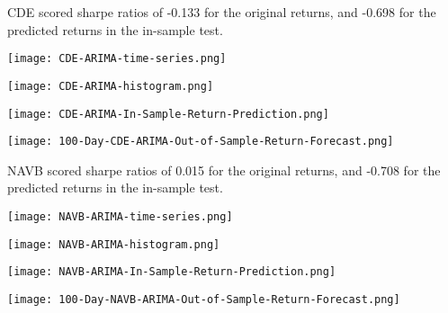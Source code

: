 CDE scored sharpe ratios of -0.133 for the original returns, and -0.698 for the predicted returns in the in-sample test.

\begin{center}
    \texttt{[image: CDE-ARIMA-time-series.png]}
    \label{fig:nonfloat}
\end{center}

\begin{center}
    \texttt{[image: CDE-ARIMA-histogram.png]}
    \label{fig:nonfloat}
\end{center}

\begin{center}  
    \texttt{[image: CDE-ARIMA-In-Sample-Return-Prediction.png]}
    \label{fig:nonfloat}
\end{center}

\begin{center}
    \texttt{[image: 100-Day-CDE-ARIMA-Out-of-Sample-Return-Forecast.png]}
    \label{fig:nonfloat}
\end{center}

NAVB scored sharpe ratios of 0.015 for the original returns, and -0.708 for the predicted returns in the in-sample test.

\begin{center}  
    \texttt{[image: NAVB-ARIMA-time-series.png]}
    \label{fig:nonfloat}
\end{center}

\begin{center}
    \texttt{[image: NAVB-ARIMA-histogram.png]}
    \label{fig:nonfloat}
\end{center}

\begin{center}  
    \texttt{[image: NAVB-ARIMA-In-Sample-Return-Prediction.png]}
    \label{fig:nonfloat}
\end{center}

\begin{center}
    \texttt{[image: 100-Day-NAVB-ARIMA-Out-of-Sample-Return-Forecast.png]}
    \label{fig:nonfloat}
\end{center}


